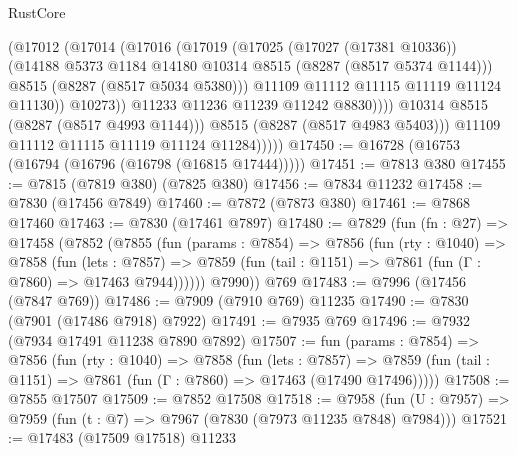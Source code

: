 \begin{lexlean}{RustCore}
\begin{coremodule}
                          (@17012
                            (@17014
                              (@17016
                                (@17019
                                  (@17025
                                    (@17027 (@17381 @10336))
                                    (@14188
                                      @5373
                                      @1184
                                      @14180
                                      @10314
                                      @8515
                                      (@8287 (@8517 @5374 @1144)))
                                    @8515
                                    (@8287 (@8517 @5034 @5380)))
                                  @11109
                                  @11112
                                  @11115
                                  @11119
                                  @11124
                                  @11130))
                              @10273))
                          @11233
                          @11236
                          @11239
                          @11242
                          @8830))))
                  @10314
                  @8515
                  (@8287 (@8517 @4993 @1144)))
                @8515
                (@8287 (@8517 @4983 @5403)))
              @11109
              @11112
              @11115
              @11119
              @11124
              @11284)))))
@17450 := @16728 (@16753 (@16794 (@16796 (@16798 (@16815 @17444)))))
@17451 := @7813 @380
@17455 := @7815 (@7819 @380) (@7825 @380)
@17456 := @7834 @11232
@17458 := @7830 (@17456 @7849)
@17460 := @7872 (@7873 @380)
@17461 := @7868 @17460
@17463 := @7830 (@17461 @7897)
@17480 := @7829
    (fun (fn : @27) =>
    @17458
      (@7852
        (@7855
          (fun (params : @7854) =>
          @7856
            (fun (rty : @1040) =>
            @7858
              (fun (lets : @7857) =>
              @7859 (fun (tail : @1151) => @7861 (fun (Γ : @7860) => @17463 @7944))))))
        @7990))
    @769
@17483 := @7996 (@17456 (@7847 @769))
@17486 := @7909 (@7910 @769) @11235
@17490 := @7830 (@7901 (@17486 @7918) @7922)
@17491 := @7935 @769
@17496 := @7932 (@7934 @17491 @11238 @7890 @7892)
@17507 := fun (params : @7854) =>
  @7856
    (fun (rty : @1040) =>
    @7858
      (fun (lets : @7857) =>
      @7859 (fun (tail : @1151) => @7861 (fun (Γ : @7860) => @17463 (@17490 @17496)))))
@17508 := @7855 @17507
@17509 := @7852 @17508
@17518 := @7958
    (fun (U : @7957) => @7959 (fun (t : @7) => @7967 (@7830 (@7973 @11235 @7848) @7984)))
@17521 := @17483 (@17509 @17518) @11233

\end{coremodule}
\end{lexlean}
